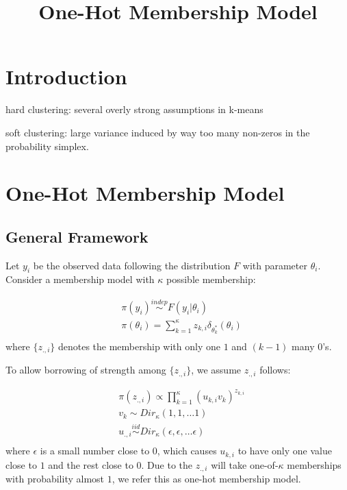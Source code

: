 \documentclass[12pt]{article}
\title
    {One-Hot Membership Model}
\date{}
\begin{document}
    
\maketitle

\section{Introduction}

hard clustering:
several overly strong assumptions in k-means

soft clustering:
large variance induced by way too many non-zeros in the probability simplex.

\section{One-Hot Membership Model}

\subsection{General Framework}

Let $y_i$ be the observed data following the distribution $F$ with parameter $\theta_i$. Consider a  membership model with $\kappa$ possible membership:

\begin{equation}
\begin{aligned}
& \pi(y_i) \stackrel{indep}{\sim} F(y_i|\theta_i) \\
& \pi(\theta_i) = \sum_{k=1}^{\kappa} z_{k,i} \delta_{\theta^*_{k}}(\theta_i) \\
\end{aligned}
\label{membership_model}
\end{equation}
where $\{ z_{.,i}\}$ denotes the membership with only one $1$ and $(k-1)$ many $0$'s.

To allow borrowing of strength among $\{ z_{.,i}\}$, we assume $z_{.,i}$ follows:

\begin{equation}
\begin{aligned}
& \pi (z_{.,i}) \propto  \prod_{k=1}^{\kappa} (u_{k,i}v_{k} )^{z_{k,i}}  \\
 & v_{k} \sim Dir_{\kappa}(1,1,\ldots 1)\\
  & u_{.,i} \stackrel{iid}{\sim} Dir_{\kappa}(\epsilon,\epsilon,\ldots \epsilon)\\
\end{aligned}
\label{one_hot}
\end{equation}
where $\epsilon$ is a small number close to $0$, which causes $u_{k,i}$ to have only one value close to $1$ and the rest close to $0$. Due to the $z_{.,i}$ will take one-of-$\kappa$ memberships with probability almost $1$, we refer this  as one-hot membership model.
\end{document}
